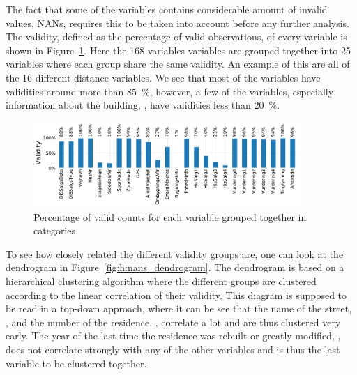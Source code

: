 The fact that some of the variables contains considerable amount of invalid values, NANs, requires this to be taken into account before any further analysis. The validity, defined as the percentage of valid observations, of every variable is shown in Figure~\ref{fig:h:nans}. Here the \num{168} variables variables are grouped together into \num{25} variables where each group share the same validity. An example of this are all of the \num{16} different distance-variables. We see that most of the variables have validities around more than 
\SI{85}{\percent}, however, a few of the variables, especially information about the building, , have validities less than \SI{20}{\percent}. 


\begin{figure}
  \centerfloat
  \includegraphics[width=0.9\textwidth, trim=0 0 0 0, clip]{figures/housing/missing_bar.pdf}
  \caption[Validity of Input Features]
          {Percentage of valid counts for each variable grouped together in categories.}
  \label{fig:h:nans}
\end{figure}

To see how closely related the different validity groups are, one can look at the dendrogram in Figure~\ref{fig:h:nans_dendrogram}. The dendrogram is based on a hierarchical clustering algorithm \citep{virtanenSciPyFundamentalAlgorithms2019} where the different groups are clustered according to the linear correlation of their validity. This diagram is supposed to be read in a top-down approach, where it can be see that the name of the street, , and the number of the residence, , correlate a lot and are thus clustered very early. The year of the last time the residence was rebuilt or greatly modified, , does not correlate strongly with any of the other variables and is thus the last variable to be clustered together. 

